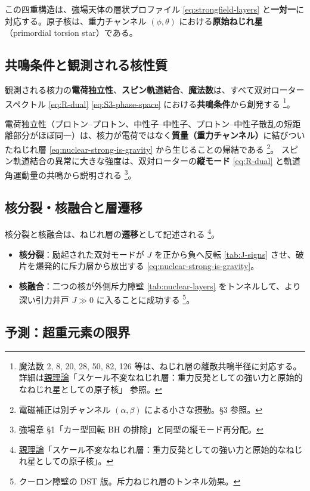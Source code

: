 \documentclass[dvipdfmx,a4paper,oneside]{jsbook}
\numberwithin{equation}{chapter}
\begin{document}
この四重構造は、強場天体の層状プロファイル \eqref{eq:strongfield-layers} と\textbf{一対一}に対応する。原子核は、重力チャンネル \((\phi, \theta)\) における\textbf{原始ねじれ星}（primordial torsion star）である。

\subsection{共鳴条件と観測される核性質}

観測される核力の\textbf{電荷独立性}、\textbf{スピン軌道結合}、\textbf{魔法数}は、すべて双対ロータースペクトル \eqref{eq:R-dual} \eqref{eq:S3-phase-space} における\textbf{共鳴条件}から創発する \footnote{魔法数 2, 8, 20, 28, 50, 82, 126 等は、ねじれ層の離散共鳴半径に対応する。詳細は\hyperref[sec:sister-manuscripts]{親理論}「スケール不変なねじれ層：重力反発としての強い力と原始的なねじれ星としての原子核」 参照。}。

電荷独立性（プロトン--プロトン、中性子--中性子、プロトン--中性子散乱の短距離部分がほぼ同一）は、核力が電荷ではなく\textbf{質量（重力チャンネル）}に結びついたねじれ層 \eqref{eq:nuclear-strong-is-gravity} から生じることの帰結である \footnote{電磁補正は別チャンネル \((\alpha, \beta)\) による小さな摂動。§3 参照。}。
スピン軌道結合の異常に大きな強度は、双対ローターの\textbf{縦モード} \eqref{eq:R-dual} と軌道角運動量の共鳴から説明される \footnote{強場章 §1「カー型回転 BH の排除」と同型の縦モード再分配。}。

\subsection{核分裂・核融合と層遷移}

核分裂と核融合は、ねじれ層の\textbf{遷移}として記述される \footnote{\hyperref[sec:sister-manuscripts]{親理論}「スケール不変なねじれ層：重力反発としての強い力と原始的なねじれ星としての原子核」。}。

\begin{itemize}[leftmargin=2em]
  \item \textbf{核分裂}：励起された双対モードが \(J\) を正から負へ反転 \eqref{tab:J-signs} させ、破片を爆発的に斥力層から放出する \eqref{eq:nuclear-strong-is-gravity}。
  \item \textbf{核融合}：二つの核が外側斥力障壁 \eqref{tab:nuclear-layers} をトンネルして、より深い引力井戸 \(J \gg 0\) に入ることに成功する \footnote{クーロン障壁の DST 版。斥力ねじれ層のトンネル効果。}。
\end{itemize}

\subsection{予測：超重元素の限界}
\end{document}
